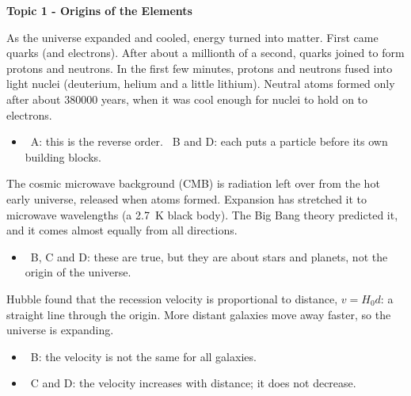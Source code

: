 \documentclass[12pt]{article}
\newcommand\anstopic[1]{\par\Needspace{8\baselineskip}\vspace{4mm}%
  \begin{center}{\headfont\bfseries\fontsize{14}{18}\selectfont #1\par}\end{center}\vspace{2pt}}
\begin{document}
\begin{practiceanswers}

\anstopic{Topic 1 - Origins of the Elements}

\begin{practiceans}
  As the universe expanded and cooled, energy turned into matter. First came quarks (and electrons).
  After about a millionth of a second, quarks joined to form protons and neutrons. In the first few
  minutes, protons and neutrons fused into light nuclei (deuterium, helium and a little lithium). Neutral atoms formed only after about
  \num{380000} years, when it was cool enough for nuclei to hold on to electrons.
  \begin{itemize}
    \item \xmark\ A: this is the reverse order. \quad \xmark\ B and D: each puts a particle before its
          own building blocks.
  \end{itemize}
\end{practiceans}

\begin{practiceans}
  The cosmic microwave background (CMB) is radiation left over from the hot early universe, released
  when atoms formed. Expansion has stretched it to microwave wavelengths (a \qty{2.7}{K} black body). The
  Big Bang theory predicted it, and it comes almost equally from all directions.
  \begin{itemize}
    \item \xmark\ B, C and D: these are true, but they are about stars and planets, not the origin of
          the universe.
  \end{itemize}
\end{practiceans}

\begin{practiceans}
  Hubble found that the recession velocity is proportional to distance, $v = H_0 d$: a straight line
  through the origin. More distant galaxies move away faster, so the universe is expanding.
  \begin{itemize}
    \item \xmark\ B: the velocity is not the same for all galaxies.
    \item \xmark\ C and D: the velocity increases with distance; it does not decrease.
  \end{itemize}
\end{practiceans}


\end{practiceanswers}
\end{document}
